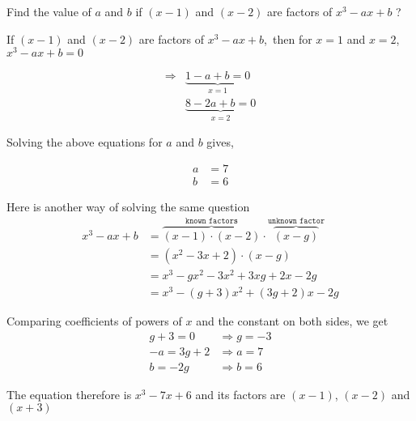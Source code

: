 \question[4] Find the value of $a$ and $b$ if $(x-1)$ and $(x-2)$
are factors of $x^3-ax+b$ ?

\ifprintanswers
\fi 

\begin{solution}[\halfpage]

  If $(x-1)$ and $(x-2)$ are factors of $x^3-ax+b$,\, 
  then for $x=1$ and $x=2$,\,$x^3-ax+b = 0$

  \begin{align}
    \Rightarrow & \underbrace{1-a+b = 0}_{\texttt{$x=1$}} \\ 
                & \underbrace{8-2a+b = 0}_{\texttt{$x=2$}}
  \end{align} 

  Solving the above equations for $a$ and $b$ gives, 

  \begin{align}
    a &= 7 \\
    b &= 6
  \end{align} 

  Here is another way of solving the same question
  \setcounter{equation}{0}
  \begin{align}
    x^3-ax+b &= \overbrace{(x-1)\cdot(x-2)}^{\texttt{known factors}}
                \cdot\overbrace{(x-g)}^{\texttt{unknown factor}} \\
             &= (x^2-3x+2)\cdot(x-g) \\ 
             &= x^3-gx^2-3x^2+3xg+2x-2g \\
             &= x^3-(g+3)x^2+(3g+2)x-2g 
  \end{align} 

  Comparing coefficients of powers of $x$ and the constant on both sides, we get
  \begin{align} 
    g+3 = 0 &\Rightarrow g = -3 \\ 
    -a = 3g + 2 &\Rightarrow a = 7 \\ 
    b = -2g &\Rightarrow b = 6
  \end{align} 

  The equation therefore is $x^3-7x+6$ and its factors are $(x-1)$, $(x-2)$ 
  and $(x+3)$
\end{solution} 

\ifprintanswers
\fi 
